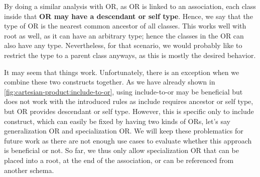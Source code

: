 \bigskip

By doing a similar analysis with OR, as OR is linked to an association, each class inside that \textbf{OR may have a descendant or self type}. Hence, we say that the type of OR is the nearest common ancestor of all classes. This works well with root as well, as it can have an arbitrary type; hence the classes in the OR can also have any type. Nevertheless, for that scenario, we would probably like to restrict the type to a parent class anyways, as this is mostly the desired behavior.

It may seem that things work. Unfortunately, there is an exception when we combine these two constructs together. As we have already shown in \autoref{fig:cartesian-product:include-to-or}, using include-to-or may be beneficial but does not work with the introduced rules as include requires ancestor or self type, but OR provides descendant or self type. However, this is specific only to include construct, which can easily be fixed by having two kinds of ORs, let's say generalization OR and specialization OR. We will keep these problematics for future work as there are not enough use cases to evaluate whether this approach is beneficial or not. So far, we thus only allow specialization OR that can be placed into a root, at the end of the association, or can be referenced from another schema.


